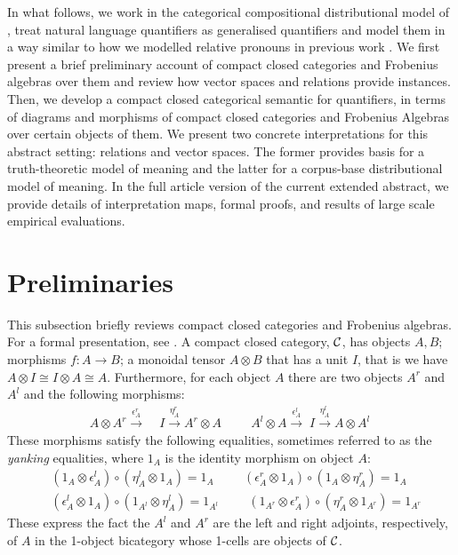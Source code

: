 \documentclass[a4paper,11pt]{easychair}
\begin{document}
In what follows,  we work in the categorical compositional distributional model of \cite{Coeckeetal}, treat natural language quantifiers as generalised quantifiers and model  them in a  way similar  to how we modelled  relative pronouns  in previous work \cite{SadrClarkCoecke1, SadrClarkCoecke2}. We  first present  a brief preliminary account of compact closed categories and Frobenius algebras over them and review  how vector spaces and relations provide instances. Then, we develop a compact closed categorical semantic for quantifiers, in terms of diagrams and morphisms of compact closed categories and Frobenius Algebras over certain objects of them. We present two concrete interpretations for this abstract setting: relations and vector spaces. The former provides  basis for  a  truth-theoretic model of meaning and the latter  for a corpus-base distributional model of meaning.  In the full article version of the current extended abstract, we provide details of interpretation maps,   formal proofs,  and results of  large scale empirical evaluations. 




\section{Preliminaries}
This subsection briefly reviews compact closed
categories and Frobenius algebras. For a formal presentation, see
\cite{KellyLaplaza80,Kock72}.  A compact closed category, $\mathcal{C}$, has objects $A, B$; morphisms $f \colon A
\to B$; a monoidal tensor $A \otimes B$ that has a unit $I$, that is we have $A \otimes I \cong I \otimes A \cong A$. Furthermore, for
each object $A$ there are two objects $A^r$ and $A^l$ and  the
following morphisms:
\begin{align*}
A \otimes A^r \stackrel{\epsilon_A^r} {\longrightarrow} \; &I
\stackrel{\eta_A^r}{\longrightarrow} A^r \otimes A \hspace{1cm}
A^l \otimes A \stackrel{\epsilon_A^l}{\longrightarrow} \; I
\stackrel{\eta_A^l}{\longrightarrow} A \otimes A^l\
\end{align*}
These morphisms satisfy the following equalities, sometimes
referred to as the \emph{yanking} equalities, where $1_A$ is the
identity morphism on object $A$:
\begin{align*}
& (1_A \otimes \epsilon_A^l) \circ (\eta_A^l \otimes 1_A)  = 1_A 
\hspace{1cm}
(\epsilon_A^r \otimes 1_A) \circ (1_A \otimes
  \eta_A^r)   = 1_A\\
& (\epsilon_A^l \otimes 1_A) \circ (1_{A^l} \otimes
  \eta_A^l) = 1_{A^l}  
    \hspace{1cm}
    (1_{A^r} \otimes \epsilon_A^r) \circ (\eta_A^r \otimes 1_{A^r}) = 1_{A^r}
\end{align*}
%
\noindent These express the fact the $A^l$ and $A^r$ are the left and right
adjoints, respectively, of $A$ in the 1-object bicategory whose
1-cells are objects of $\mathcal{C}$.
\end{document}
